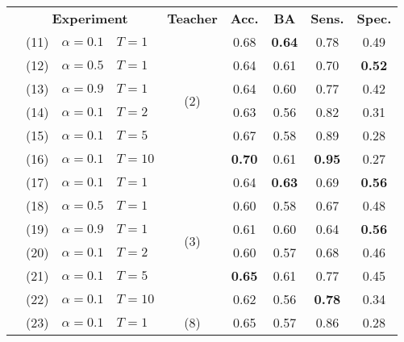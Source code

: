 \begin{table}
    \centering
    \begin{tabular}{c|lll|c|c|c|c|c|}
        \hhline{~--------}
        & \multicolumn{3}{|c|}{\textbf{Experiment}} & \textbf{Teacher} & \textbf{Acc.} & \textbf{BA} & \textbf{Sens.} & \textbf{Spec.} \\
        \hhline{~========}
        & (11) & $\alpha=0.1$ & $T=1$  & \multirow{6}{*}{(2)} &         0.68  & \textbf{0.64} &         0.78  &         0.49  \\
        & (12) & $\alpha=0.5$ & $T=1$  &                      &         0.64  &         0.61  &         0.70  & \textbf{0.52} \\
        & (13) & $\alpha=0.9$ & $T=1$  &                      &         0.64  &         0.60  &         0.77  &         0.42  \\
        & (14) & $\alpha=0.1$ & $T=2$  &                      &         0.63  &         0.56  &         0.82  &         0.31  \\
        & (15) & $\alpha=0.1$ & $T=5$  &                      &         0.67  &         0.58  &         0.89  &         0.28  \\
        & (16) & $\alpha=0.1$ & $T=10$ &                      & \textbf{0.70} &         0.61  & \textbf{0.95} &         0.27  \\
        \hhline{~--------}
        & (17) & $\alpha=0.1$ & $T=1$  & \multirow{6}{*}{(3)} &         0.64  & \textbf{0.63} &         0.69  & \textbf{0.56} \\
        & (18) & $\alpha=0.5$ & $T=1$  &                      &         0.60  &         0.58  &         0.67  &         0.48  \\
        & (19) & $\alpha=0.9$ & $T=1$  &                      &         0.61  &         0.60  &         0.64  & \textbf{0.56} \\
        & (20) & $\alpha=0.1$ & $T=2$  &                      &         0.60  &         0.57  &         0.68  &         0.46  \\
        & (21) & $\alpha=0.1$ & $T=5$  &                      & \textbf{0.65} &         0.61  &         0.77  &         0.45  \\
        & (22) & $\alpha=0.1$ & $T=10$ &                      &         0.62  &         0.56  & \textbf{0.78} &         0.34  \\
        \hhline{~--------}
        & (23) & $\alpha=0.1$ & $T=1$  & \multirow{6}{*}{(8)} &         0.65  &         0.57  &         0.86  &         0.28  \\

\end{tabular}
\end{table}
